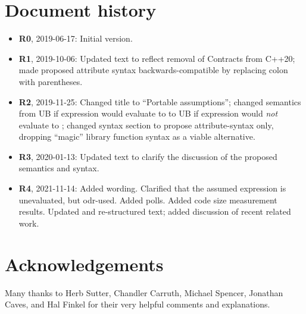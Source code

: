 \section*{Document history}

\begin{itemize}
\item \textbf{R0}, 2019-06-17: Initial version.
\item \textbf{R1}, 2019-10-06: Updated text to reflect removal of Contracts from C++20; made proposed attribute syntax backwards-compatible by replacing colon with parentheses.
\item \textbf{R2}, 2019-11-25: Changed title to ``Portable assumptions''; changed semantics from UB if expression would evaluate to  to UB if expression would \emph{not} evaluate to ; changed syntax section to propose attribute-syntax only, dropping ``magic'' library function syntax as a viable alternative.
\item \textbf {R3}, 2020-01-13: Updated text to clarify the discussion of the proposed semantics and syntax.
\item \textbf{R4}, 2021-11-14:  Added wording. Clarified that the assumed expression is unevaluated, but odr-used. Added polls. Added code size measurement results. Updated and re-structured text; added discussion of recent related work.
\end{itemize}

\section*{Acknowledgements}

Many thanks to Herb Sutter, Chandler Carruth, Michael Spencer, Jonathan Caves, and Hal Finkel for their very helpful comments and explanations.

\renewcommand{\bibname}{References}



